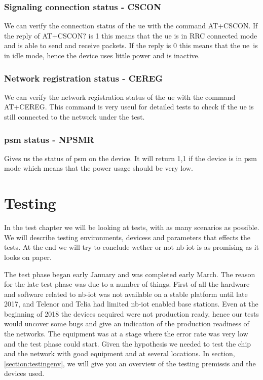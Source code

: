 \documentclass[USenglish]{ifimaster}  %
\begin{document}
\subsection{Signaling connection status - CSCON}
We can verify the connection status of the \acrshort{ue} with the command AT+CSCON. If the reply of AT+CSCON? is 1 this means that the \acrshort{ue} is in RRC connected mode and is able to send and receive packets. If the reply is 0 this means that the \acrshort{ue} is in idle mode, hence the device uses little power and is inactive.

\subsection{Network registration status - CEREG}
We can verify the network registration status of the \acrshort{ue} with the command AT+CEREG. This command is very useul for detailed tests to check if the \acrshort{ue} is still connected to the network under the test.

\subsection{\acrshort{psm} status - NPSMR}
Gives us the status of \acrshort{psm} on the device. It will return 1,1 if the device is in \acrshort{psm} mode which means that the power usage should be very low.

\chapter{Testing} \label{section:testing}
In the test chapter we will be looking at tests, with as many scenarios as possible. We will describe testing environments, devicess and parameters that effects the tests. At the end we will try to conclude wether or not \acrshort{nb-iot} is as promising as it looks on paper.

The test phase began early January and was completed early March. The reason for the late test phase was due to a number of things. First of all the hardware and software related to \acrshort{nb-iot} was not available on a stable platform until late 2017, and Telenor and Telia had limited \acrshort{nb-iot} enabled base stations. Even at the beginning of 2018 the devices acquired were not production ready, hence our tests would uncover some bugs and give an indication of the production readiness of the networks. The equipment was at a stage where the error rate was very low and the test phase could start. Given the hypothesis we needed to test the chip and the network with good equipment and at several locations. In section, \vref{section:testingenv}, we will give you an overview of the testing premissis and the devices used.
\end{document}
